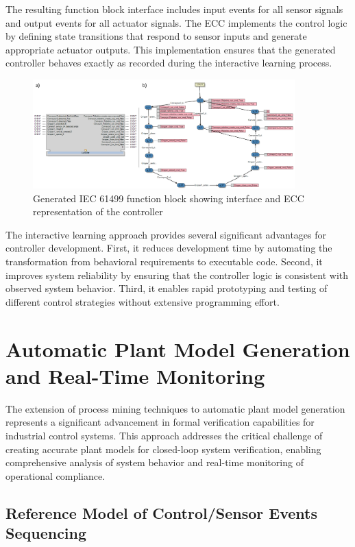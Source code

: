 The resulting function block interface includes input events for all sensor signals and output events for all actuator signals. The ECC implements the control logic by defining state transitions that respond to sensor inputs and generate appropriate actuator outputs. This implementation ensures that the generated controller behaves exactly as recorded during the interactive learning process.

\begin{figure}[h]
    \centering
    \includegraphics[width=0.9\textwidth]{MX_Papers/Paper6/images/FB.PNG}
    \caption{Generated IEC 61499 function block showing interface and ECC representation of the controller}
    \label{fig:generated_function_block}
\end{figure}

The interactive learning approach provides several significant advantages for controller development. First, it reduces development time by automating the transformation from behavioral requirements to executable code. Second, it improves system reliability by ensuring that the controller logic is consistent with observed system behavior. Third, it enables rapid prototyping and testing of different control strategies without extensive programming effort.

\section{Automatic Plant Model Generation and Real-Time Monitoring}

The extension of process mining techniques to automatic plant model generation represents a significant advancement in formal verification capabilities for industrial control systems. This approach addresses the critical challenge of creating accurate plant models for closed-loop system verification, enabling comprehensive analysis of system behavior and real-time monitoring of operational compliance.

\subsection{Reference Model of Control/Sensor Events Sequencing}

